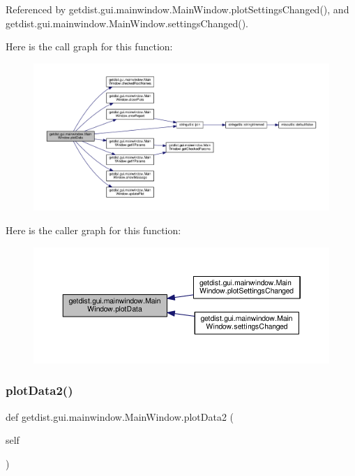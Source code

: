 Referenced by getdist.\+gui.\+mainwindow.\+Main\+Window.\+plot\+Settings\+Changed(), and getdist.\+gui.\+mainwindow.\+Main\+Window.\+settings\+Changed().

Here is the call graph for this function\+:
\nopagebreak
\begin{figure}[H]
\begin{center}
\leavevmode
\includegraphics[width=350pt]{classgetdist_1_1gui_1_1mainwindow_1_1MainWindow_ae498c95f48e909b62f663f16d824e941_cgraph}
\end{center}
\end{figure}
Here is the caller graph for this function\+:
\nopagebreak
\begin{figure}[H]
\begin{center}
\leavevmode
\includegraphics[width=350pt]{classgetdist_1_1gui_1_1mainwindow_1_1MainWindow_ae498c95f48e909b62f663f16d824e941_icgraph}
\end{center}
\end{figure}
\mbox{\label{classgetdist_1_1gui_1_1mainwindow_1_1MainWindow_acf1bc04cb32ad1a78b92673311609c7c}} 
\subsubsection{\texorpdfstring{plot\+Data2()}{plotData2()}}
{\footnotesize\ttfamily def getdist.\+gui.\+mainwindow.\+Main\+Window.\+plot\+Data2 (\begin{DoxyParamCaption}\item[{}]{self }\end{DoxyParamCaption})}

